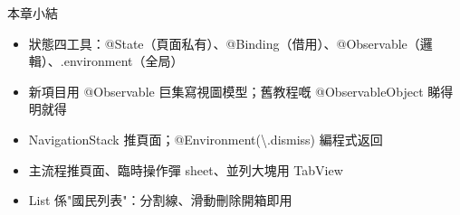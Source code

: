\begin{tcbsummary}{本章小結}
\begin{itemize}
  \item 狀態四工具：@State（頁面私有）、@Binding（借用）、@Observable（邏輯）、.environment（全局）
  \item 新項目用 @Observable 巨集寫視圖模型；舊教程嘅 @ObservableObject 睇得明就得
  \item NavigationStack 推頁面；@Environment(\textbackslash{}.dismiss) 編程式返回
  \item 主流程推頁面、臨時操作彈 sheet、並列大塊用 TabView
  \item List 係"國民列表"：分割線、滑動刪除開箱即用
\end{itemize}

\end{tcbsummary}
